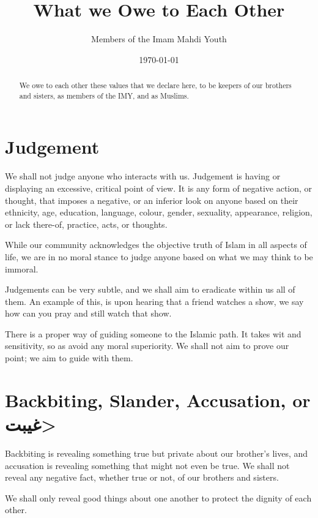 \documentclass{article}
\begin{document}
\linenumbers



\title{What we Owe to Each Other}
\author{Members of the Imam Mahdi Youth}
\date{\today}
\maketitle

\begin{abstract}
      We owe to each other these values that we declare here, to be keepers of our brothers and sisters, as members of the IMY, and as Muslims.
\end{abstract}

\section{Judgement}
We shall not judge anyone who interacts with us.
Judgement is having or displaying an excessive, critical point of view.
It is any form of negative action, or thought, that imposes a negative, or an inferior look on anyone based on their ethnicity, age, education, language, colour, gender, sexuality, appearance, religion, or lack there-of, practice, acts, or thoughts.

While our community acknowledges the objective truth of Islam in all aspects of life, we are in no moral stance to judge anyone based on what we may think to be immoral.

Judgements can be very subtle, and we shall aim to eradicate within us all of them.
An example of this, is upon hearing that a friend watches a show, we say how can you pray and still watch that show.

There is a proper way of guiding someone to the Islamic path. It takes wit and sensitivity, so as avoid any moral superiority. We shall not aim to prove our point; we aim to guide with them.


\section{Backbiting, Slander, Accusation, or \<غیبت>}

Backbiting is revealing something true but private about our brother's lives, and accusation is revealing something that might not even be true.
We shall not reveal any negative fact, whether true or not, of our brothers and sisters.

We shall only reveal good things about one another to protect the dignity of each other.
\end{document}
